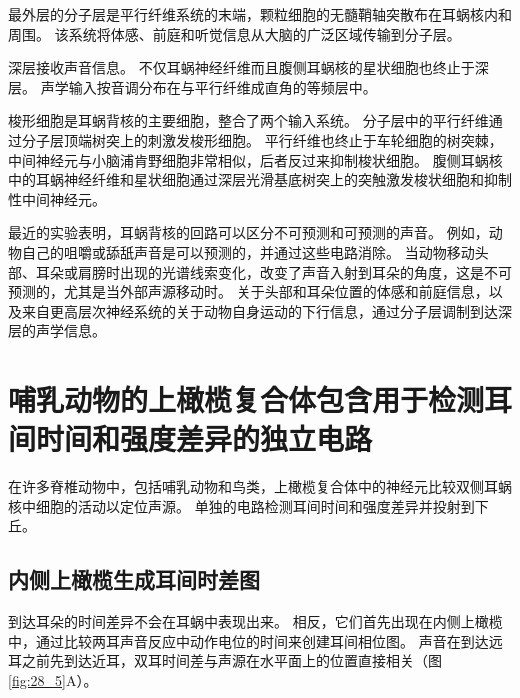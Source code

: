 最外层的分子层是平行纤维系统的末端，颗粒细胞的无髓鞘轴突散布在耳蜗核内和周围。
该系统将体感、前庭和听觉信息从大脑的广泛区域传输到分子层。


深层接收声音信息。
不仅耳蜗神经纤维而且腹侧耳蜗核的星状细胞也终止于深层。
声学输入按音调分布在与平行纤维成直角的等频层中。


梭形细胞是耳蜗背核的主要细胞，整合了两个输入系统。
分子层中的平行纤维通过分子层顶端树突上的刺激发梭形细胞。
平行纤维也终止于车轮细胞的树突棘，中间神经元与小脑浦肯野细胞非常相似，后者反过来抑制梭状细胞。
腹侧耳蜗核中的耳蜗神经纤维和星状细胞通过深层光滑基底树突上的突触激发梭状细胞和抑制性中间神经元。


最近的实验表明，耳蜗背核的回路可以区分不可预测和可预测的声音。 
例如，动物自己的咀嚼或舔舐声音是可以预测的，并通过这些电路消除。
当动物移动头部、耳朵或肩膀时出现的光谱线索变化，改变了声音入射到耳朵的角度，这是不可预测的，尤其是当外部声源移动时。
关于头部和耳朵位置的体感和前庭信息，以及来自更高层次神经系统的关于动物自身运动的下行信息，通过分子层调制到达深层的声学信息。


\section{哺乳动物的上橄榄复合体包含用于检测耳间时间和强度差异的独立电路}

在许多脊椎动物中，包括哺乳动物和鸟类，上橄榄复合体中的神经元比较双侧耳蜗核中细胞的活动以定位声源。
单独的电路检测耳间时间和强度差异并投射到下丘。


\subsection{内侧上橄榄生成耳间时差图}

到达耳朵的时间差异不会在耳蜗中表现出来。 
相反，它们首先出现在内侧上橄榄中，通过比较两耳声音反应中动作电位的时间来创建耳间相位图。
声音在到达远耳之前先到达近耳，双耳时间差与声源在水平面上的位置直接相关（图 \ref{fig:28_5}A）。


